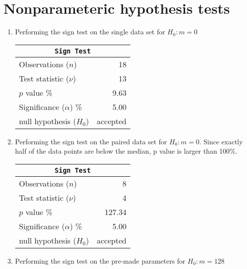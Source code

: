 \chapter{Nonparameteric hypothesis tests}

\begin{enumerate}
	
	\item Performing the sign test on the single data set for $ H_0 : m = 0 $\\
	
	\begin{table}[H]
		\centering
		\begin{tabular}{@{}lr@{}}
			\toprule
			\multicolumn{2}{c}{\texttt{Sign Test}} \\
			\midrule
			Observations ($n$)         &        18 \\
			Test statistic ($\nu$)     &        13 \\
			$p$ value \%               &      9.63 \\
			Significance ($\alpha$) \% &      5.00 \\
			null hypothesis ($H_0$)    &  accepted \\
			\bottomrule
		\end{tabular}
		
	\end{table}
	\bigskip
	
	\item Performing the sign test on the paired data set for $ H_0 : m = 0 $. Since exactly half of the data points are below the median, p value is larger than 100\%.
	
	\begin{table}[H]
		\centering
		\begin{tabular}{@{}lr@{}}
			\toprule
			\multicolumn{2}{c}{\texttt{Sign Test}} \\
			\midrule
			Observations ($n$)         &         8 \\
			Test statistic ($\nu$)     &         4 \\
			$p$ value \%               &    127.34 \\
			Significance ($\alpha$) \% &      5.00 \\
			null hypothesis ($H_0$)    &  accepted \\
			\bottomrule
		\end{tabular}
		
	\end{table}
	\bigskip
	
	\item Performing the sign test on the pre-made parameters for $ H_0 : m = 128 $\\
	

\end{enumerate}
